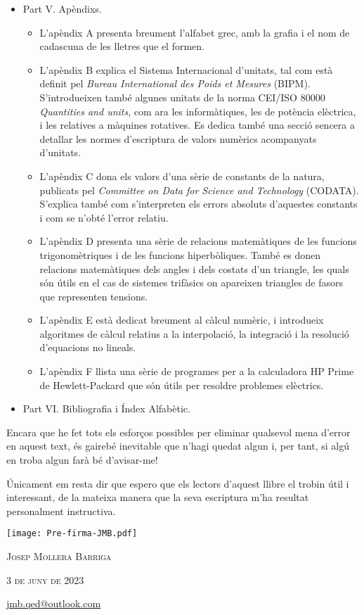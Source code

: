 \begin{itemize}
\begin{itemize}
		\end{itemize}
		\item Part V. Apèndixs. 
		\begin{itemize}
			\item L'apèndix A presenta breument l'alfabet grec, amb la grafia i el nom de cadascuna de les lletres que el formen.
			\item L'apèndix B explica el Sistema Internacional d'unitats, tal com està definit pel \textit{Bureau International des Poids et Mesures} (BIPM). S'introdueixen també algunes unitats de la norma CEI/ISO 80000 \textit{Quantities and units}, com ara les informàtiques, les de potència elèctrica, i les relatives a màquines rotatives. Es dedica també una secció sencera a detallar les normes d'escriptura de valors numèrics acompanyats d'unitats.
			\item L'apèndix C dona els valors d'una sèrie de constants de la natura,   publicats
			pel \textit{Committee on Data for
			Science and Technology} (CODATA). S'explica també com s'interpreten els errors absoluts d'aquestes constants i com se n'obté l'error relatiu.
			\item L'apèndix D presenta una sèrie de relacions matemàtiques de les funcions trigonomètriques i de les funcions hiperbòliques. També es donen relacions matemàtiques dels angles i dels costats d'un triangle, les quals són útils en el cas de sistemes trifàsics on apareixen triangles de fasors que representen tensions.
			\item L'apèndix E està dedicat breument al càlcul numèric, i introdueix algoritmes de càlcul relatius a la interpolació, la integració i la resolució d'equacions no lineals.
			\item L'apèndix F llista una sèrie de programes per a la calculadora \textsf{HP Prime} de Hewlett-Packard que són útils per resoldre problemes elèctrics. 
		\end{itemize}
		\item Part VI.  Bibliografia i  Índex Alfabètic.
	\end{itemize}
		

    Encara que he fet tots els esforços possibles per eliminar qualsevol
    mena  d'error en aquest text, és gairebé inevitable que n'hagi quedat algun i,
    per tant, si algú en troba algun  farà bé d'avisar-me!


   Únicament em resta dir que espero que els lectors d'aquest llibre el trobin    útil i interessant, de la mateixa manera que la seva escriptura m'ha resultat  personalment instructiva.


\hfill
\begin{minipage}[b]{30mm}
    \texttt{[image: Pre-firma-JMB.pdf]}
\end{minipage}

{\large

    \hfill \textsc{Josep Mollera Barriga} 

    \hfill \textsc{3 de juny de 2023} 

    \hfill {\small \href{mailto:jmb.qed@outlook.com}{\faEnvelope\hspace{2mm}jmb.qed@outlook.com} }

}
